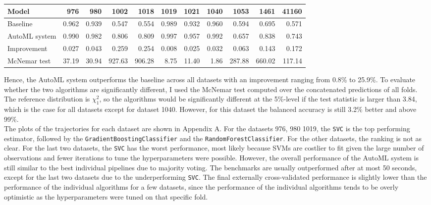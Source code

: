 \documentclass[11pt]{article}
\begin{document}
\vspace{-0.2cm}
\begin{table}[H]
\centering
\begin{tabular}{lrrrrrrrrrr}
\toprule
Model &   976 &   980 &  1002 &  1018 &  1019 &  1021 &  1040 &  1053 &  1461 &  41160 \\
\midrule
Baseline & 0.962 & 0.939 & 0.547 & 0.554 & 0.989 & 0.932 & 0.960 & 0.594 & 0.695 & 0.571 \\
AutoML system & 0.990 & 0.982 & 0.806 & 0.809 & 0.997 & 0.957 & 0.992 & 0.657 & 0.838 & 0.743 \\
\midrule
Improvement & 0.027 & 0.043 & 0.259 & 0.254 & 0.008 & 0.025 & 0.032 & 0.063 & 0.143 & 0.172 \\
McNemar test & 37.19 & 30.94 & 927.63 & 906.28 & 8.75 & 11.40 & 1.86 & 287.88 & 660.02 & 117.14 \\
\bottomrule
\end{tabular}
\end{table}
\vspace{-0.2cm}

Hence, the AutoML system outperforms the baseline across all datasets with an improvement ranging from 0.8\% to 25.9\%. To evaluate whether the two algorithms are significantly different, I used the McNemar test computed over the concatenated predictions of all folds. The reference distribution is $\chi_{1}^{2}$, so the algorithms would be significantly different at the 5\%-level if the test statistic is larger than 3.84, which is the case for all datasets except for dataset 1040. However, for this dataset the balanced accuracy is still 3.2\% better and above 99\%. \\

The plots of the trajectories for each dataset are shown in Appendix A. For the datasets 976, 980 1019, the \texttt{SVC} is the top performing estimator, followed by the \texttt{GradientBoostingClassifier} and the \texttt{RandomForestClassifier}. For the other datasets, the ranking is not as clear. For the last two datasets, the \texttt{SVC} has the worst performance, most likely because SVMs are costlier to fit given the large number of observations and fewer iterations to tune the hyperparameters were possible. However, the overall performance of the AutoML system is still similar to the best individual pipelines due to majority voting. The benchmarks are usually outperformed after at most 50 seconds, except for the last two datasets due to the underperforming \texttt{SVC}. The final externally cross-validated performance is slightly lower than the performance of the individual algorithms for a few datasets, since the performance of the individual algorithms tends to be overly optimistic as the hyperparameters were tuned on that specific fold. \\
\end{document}
